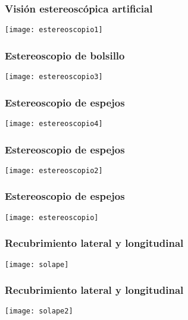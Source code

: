 \documentclass[14pt]{beamer}
\begin{document}
\begin{frame}
\frametitle{Visión estereoscópica artificial}
\begin{center}
\texttt{[image: estereoscopio1]}
\end{center}
\end{frame}
\begin{frame}
\frametitle{Estereoscopio de bolsillo}
\begin{center}
\texttt{[image: estereoscopio3]}
\end{center}
\end{frame}
\begin{frame}
\frametitle{Estereoscopio de espejos}
\begin{center}
\texttt{[image: estereoscopio4]}
\end{center}
\end{frame}
\begin{frame}
\frametitle{Estereoscopio de espejos}
\begin{center}
\texttt{[image: estereoscopio2]}
\end{center}
\end{frame}
\begin{frame}
\frametitle{Estereoscopio de espejos}
\begin{center}
\texttt{[image: estereoscopio]}
\end{center}
\end{frame}
\begin{frame}
\frametitle{Recubrimiento lateral y longitudinal}
\begin{center}
\texttt{[image: solape]}
\end{center}
\end{frame}
\begin{frame}
\frametitle{Recubrimiento lateral y longitudinal}
\begin{center}
\texttt{[image: solape2]}
\end{center}
\end{frame}
\end{document}
